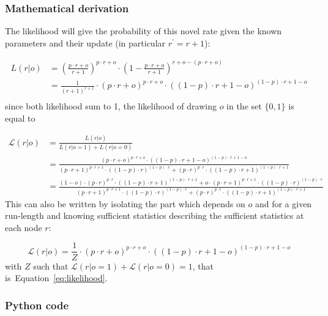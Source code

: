 \documentclass[10pt,letterpaper]{article}
\newcommand{\eql}[1]{\begin{equation}#1\end{equation}}
\newcommand{\eqs}[1]{\begin{align*}#1\end{align*}}
\newcommand{\Ll}{\mathcal{L}}
\newcommand{\seeEq}[1]{Equation~\ref{eq:#1}}
\newcommand{\AM}[1]{\textbf{\textcolor{blue}{[AM: #1]}}}
\begin{document}
\subsubsection{Mathematical derivation}

The likelihood will give the probability of this novel rate given the known parameters and their update (in particular $r^{'}=r+1$):

\eqs{
L(r | o)&={(\frac{p\cdot r + o}{r+1})}^{p\cdot r + o} \cdot (1-\frac{p\cdot r + o}{r+1})^{r + o - (p\cdot r + o)} \\
&= \frac{1}{({r+1})^{r+1}} \cdot {(p\cdot r + o)}^{p\cdot r + o}  \cdot {((1- p)\cdot r + 1- o)}^{(1- p)\cdot r + 1- o} \\
}
since both likelihood sum to 1, the likelihood of drawing $o$ in the set $\{ 0, 1 \}$   is equal to

\eqs{
\Ll(r | o)&=\frac{L(r | o)}{L(r | o=1) + L(r | o=0)}  \\
&= \frac{ {(p\cdot r + o)}^{p\cdot r + o}  \cdot {((1- p)\cdot r + 1- o)}^{(1- p)\cdot r + 1- o} }{
 {(p\cdot r + 1)}^{p\cdot r + 1}  \cdot {((1- p)\cdot r )}^{(1- p)\cdot r }  +
  {(p\cdot r )}^{p\cdot r }  \cdot {((1- p)\cdot r + 1)}^{(1- p)\cdot r + 1}
}  \\
&= \frac{ (1-o) \cdot {(p\cdot r)}^{p\cdot r}  \cdot {((1- p)\cdot r + 1)}^{(1- p)\cdot r + 1}
+ o \cdot {(p\cdot r + 1)}^{p\cdot r + 1}  \cdot {((1- p)\cdot r)}^{(1- p)\cdot r}
 }{
 {(p\cdot r + 1)}^{p\cdot r + 1}  \cdot {((1- p)\cdot r )}^{(1- p)\cdot r }  +
  {(p\cdot r )}^{p\cdot r }  \cdot {((1- p)\cdot r + 1)}^{(1- p)\cdot r + 1}
}
}
This can also be written by isolating the part which depends on $o$ and for a given run-length and knowing sufficient statistics describing the sufficient statistics at each node $r$:

\eql{
\Ll(r | o) = \frac{1}{Z} \cdot {(p \cdot r + o)}^{p \cdot r + o} \cdot {((1- p)\cdot r + 1- o)}^{(1- p)\cdot r + 1- o}
}
with $Z$ such that $\Ll(r | o=1) + \Ll(r | o=0)=1$, that is~\seeEq{likelihood}.

\subsubsection{Python code}
\end{document}
